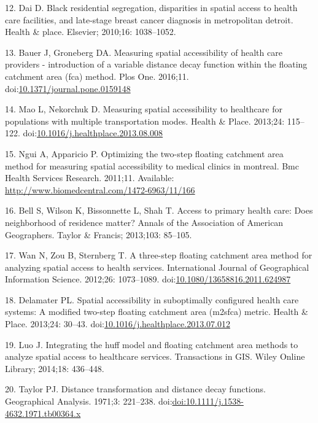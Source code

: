 \documentclass[10pt,letterpaper]{article}
\begin{document}
\hypertarget{ref-Dai2010}{}
12. Dai D. Black residential segregation, disparities in spatial access
to health care facilities, and late-stage breast cancer diagnosis in
metropolitan detroit. Health \& place. Elsevier; 2010;16: 1038--1052.

\hypertarget{ref-Bauer2016}{}
13. Bauer J, Groneberg DA. Measuring spatial accessibility of health
care providers - introduction of a variable distance decay function
within the floating catchment area (fca) method. Plos One. 2016;11.
doi:\href{https://doi.org/10.1371/journal.pone.0159148}{10.1371/journal.pone.0159148}

\hypertarget{ref-Mao2013}{}
14. Mao L, Nekorchuk D. Measuring spatial accessibility to healthcare
for populations with multiple transportation modes. Health \& Place.
2013;24: 115--122.
doi:\href{https://doi.org/10.1016/j.healthplace.2013.08.008}{10.1016/j.healthplace.2013.08.008}

\hypertarget{ref-Ngui2011}{}
15. Ngui A, Apparicio P. Optimizing the two-step floating catchment area
method for measuring spatial accessibility to medical clinics in
montreal. Bmc Health Services Research. 2011;11. Available:
\url{http://www.biomedcentral.com/1472-6963/11/166}

\hypertarget{ref-Bell2013}{}
16. Bell S, Wilson K, Bissonnette L, Shah T. Access to primary health
care: Does neighborhood of residence matter? Annals of the Association
of American Geographers. Taylor \& Francis; 2013;103: 85--105.

\hypertarget{ref-Wan2012}{}
17. Wan N, Zou B, Sternberg T. A three-step floating catchment area
method for analyzing spatial access to health services. International
Journal of Geographical Information Science. 2012;26: 1073--1089.
doi:\href{https://doi.org/10.1080/13658816.2011.624987}{10.1080/13658816.2011.624987}

\hypertarget{ref-Delamater2013}{}
18. Delamater PL. Spatial accessibility in suboptimally configured
health care systems: A modified two-step floating catchment area
(m2sfca) metric. Health \& Place. 2013;24: 30--43.
doi:\href{https://doi.org/10.1016/j.healthplace.2013.07.012}{10.1016/j.healthplace.2013.07.012}

\hypertarget{ref-Luo2014}{}
19. Luo J. Integrating the huff model and floating catchment area
methods to analyze spatial access to healthcare services. Transactions
in GIS. Wiley Online Library; 2014;18: 436--448.

\hypertarget{ref-Taylor1971}{}
20. Taylor PJ. Distance transformation and distance decay functions.
Geographical Analysis. 1971;3: 221--238.
doi:\href{https://doi.org/doi:10.1111/j.1538-4632.1971.tb00364.x}{doi:10.1111/j.1538-4632.1971.tb00364.x}
\end{document}
